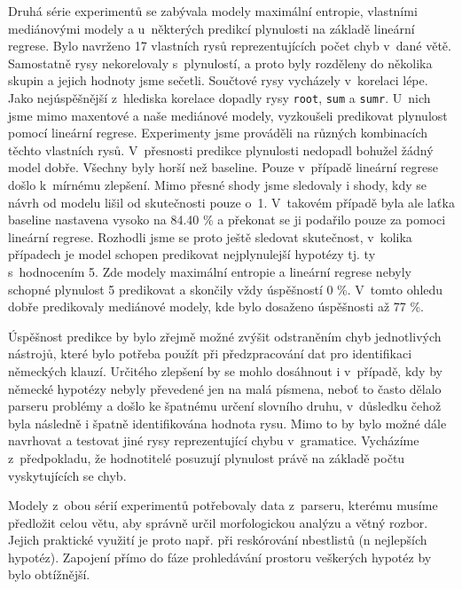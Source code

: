 \documentclass[12pt,a4paper]{report}
\let\openright=\clearpage
\def\chapwithtoc#1{
\chapter*{#1}
\addcontentsline{toc}{chapter}{#1}
}
\begin{document}
Druhá série experimentů se zabývala modely maximální entropie, vlastními mediánovými modely a u~některých predikcí plynulosti na základě lineární regrese. Bylo navrženo 17 vlastních rysů reprezentujících počet chyb v~dané větě. Samostatně rysy nekorelovaly s~plynulostí, a proto byly rozděleny do několika skupin a jejich hodnoty jsme sečetli. Součtové rysy vycházely v~korelaci lépe. Jako nejúspěšnější z~hlediska korelace dopadly rysy \texttt{root}, \texttt{sum} a \texttt{sumr}. U~nich jsme mimo maxentové a naše mediánové modely, vyzkoušeli predikovat plynulost pomocí lineární regrese. Experimenty jsme prováděli na různých kombinacích těchto vlastních rysů. V~přesnosti predikce plynulosti nedopadl bohužel žádný model dobře. Všechny byly horší než baseline. Pouze v~případě lineární regrese došlo k~mírnému zlepšení. Mimo přesné shody jsme sledovaly i shody, kdy se návrh od modelu lišil od skutečnosti pouze o~1. V~takovém případě byla ale laťka baseline nastavena vysoko na 84.40 \% a překonat se ji podařilo pouze za pomoci lineární regrese. Rozhodli jsme se proto ještě sledovat skutečnost, v~kolika případech je model schopen predikovat nejplynulejší hypotézy tj. ty s~hodnocením 5. Zde modely maximální entropie a lineární regrese nebyly schopné plynulost 5 predikovat a skončily vždy úspěšností 0 \%. V~tomto ohledu dobře predikovaly mediánové modely, kde bylo dosaženo úspěšnosti až 77 \%.

Úspěšnost predikce by bylo zřejmě možné zvýšit odstraněním chyb jednotlivých nástrojů, které bylo potřeba použít při předzpracování dat pro identifikaci německých klauzí. Určitého zlepšení by se mohlo dosáhnout i v~případě, kdy by německé hypotézy nebyly převedené jen na malá písmena, neboť to často dělalo parseru problémy a došlo ke špatnému určení slovního druhu, v~důsledku čehož byla následně i špatně identifikována hodnota rysu. Mimo to by bylo možné dále navrhovat a testovat jiné rysy reprezentující chybu v~gramatice. Vycházíme z~předpokladu, že hodnotitelé posuzují plynulost právě na základě počtu vyskytujících se chyb.

Modely z~obou sérií experimentů potřebovaly data z~parseru, kterému musíme předložit celou větu, aby správně určil morfologickou analýzu a větný rozbor. Jejich praktické využití je proto např. při reskórování nbestlistů (n nejlepších hypotéz). Zapojení přímo do fáze prohledávání prostoru veškerých hypotéz by bylo obtížnější.




\listoffigures
{}



\listoftables
{}



\openright
\end{document}

